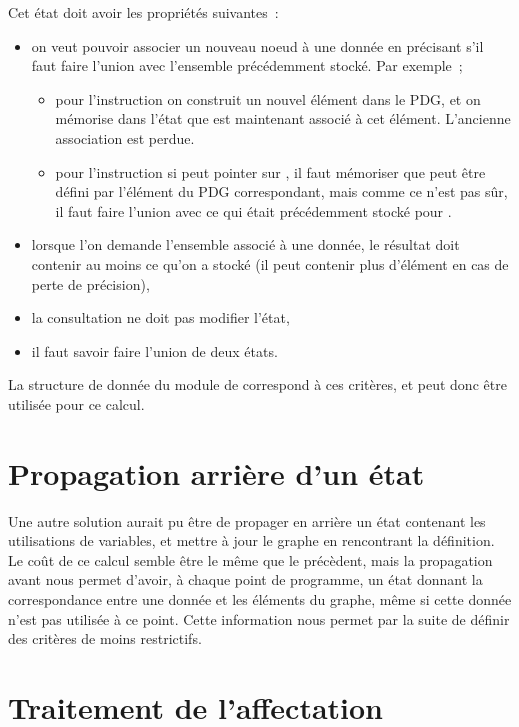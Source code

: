 Cet état doit avoir les propriétés suivantes~:
\begin{itemize}
\item on veut pouvoir associer un nouveau noeud à une donnée
en précisant s'il faut faire l'union avec l'ensemble précédemment stocké.
Par exemple~;
\begin{itemize}
\item pour l'instruction  on construit un nouvel élément
dans le PDG, et on mémorise dans l'état que  est maintenant associé
à cet élément. L'ancienne association est perdue.
\item  pour l'instruction  si  peut pointer sur ,
il faut mémoriser que   peut être défini par l'élément du PDG
correspondant, mais comme ce n'est pas sûr, il faut faire l'union avec
ce qui était précédemment stocké pour .
\end{itemize}
\item lorsque l'on demande l'ensemble associé à une donnée,
le résultat doit contenir au moins ce qu'on a stocké
(il peut contenir plus d'élément en cas de perte de précision),
\item la consultation ne doit pas modifier l'état,
\item il faut savoir faire l'union de deux états.
\end{itemize}

La structure de donnée du module  de \ppc correspond à ces critères,
et peut donc être utilisée pour ce calcul.\\

\section{Propagation arrière d'un état}

Une autre solution aurait pu être de propager en arrière
un état contenant les utilisations
de variables, et mettre à jour le graphe en rencontrant la définition.
Le coût de ce calcul semble être le même que le précèdent,
mais la propagation avant nous permet d'avoir, à chaque point de programme,
un état donnant la correspondance entre une donnée et les éléments du graphe,
même si cette donnée n'est pas utilisée à ce point.
Cette information nous permet par la suite de définir des critères
de \slicing moins restrictifs.

\section{Traitement de l'affectation}

